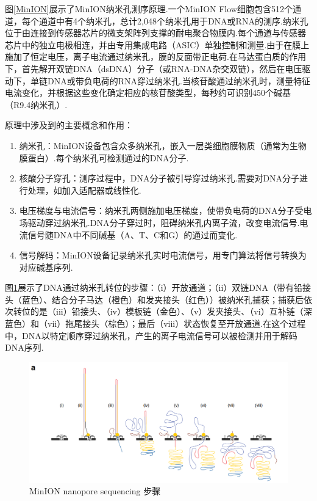 图\ref{MinION}展示了MinION纳米孔测序原理.一个MinION Flow细胞包含512个通道，每个通道中有4个纳米孔，总计2,048个纳米孔用于DNA或RNA的测序.纳米孔位于由连接到传感器芯片的微支架阵列支撑的耐电聚合物膜内.每个通道与传感器芯片中的独立电极相连，并由专用集成电路（ASIC）单独控制和测量.由于在膜上施加了恒定电压，离子电流通过纳米孔，膜的反面带正电荷.在马达蛋白质的作用下，首先解开双链DNA（dsDNA）分子（或RNA-DNA杂交双链），然后在电压驱动下，单链DNA或带负电荷的RNA穿过纳米孔.当核苷酸通过纳米孔时，测量特征电流变化，并根据这些变化确定相应的核苷酸类型，每秒约可识别450个碱基（R9.4纳米孔）.

原理中涉及到的主要概念和作用：
\begin{enumerate}
	\item 纳米孔：MinION设备包含众多纳米孔，嵌入一层类细胞膜物质（通常为生物膜蛋白）.每个纳米孔可检测通过的DNA分子.
	\item 核酸分子穿孔：测序过程中，DNA分子被引导穿过纳米孔.需要对DNA分子进行处理，如加入适配器或线性化.
	\item 电压梯度与电流信号：纳米孔两侧施加电压梯度，使带负电荷的DNA分子受电场驱动穿过纳米孔.DNA分子穿过时，阻碍纳米孔内离子流，改变电流信号.电流信号随DNA中不同碱基（A、T、C和G）的通过而变化.
	\item 信号解码：MinION设备记录纳米孔实时电流信号，用专门算法将信号转换为对应碱基序列.
\end{enumerate}

图\ref{step}展示了DNA通过纳米孔转位的步骤：（i）开放通道；（ii）双链DNA（带有铅接头（蓝色）、结合分子马达（橙色）和发夹接头（红色））被纳米孔捕获；捕获后依次转位的是（iii）铅接头、（iv）模板链（金色）、（v）发夹接头、（vi）互补链（深蓝色）和（vii）拖尾接头（棕色）；最后（viii）状态恢复至开放通道.在这个过程中，DNA以特定顺序穿过纳米孔，产生的离子电流信号可以被检测并用于解码DNA序列.

\begin{figure}[htp!]
	\centering
	\includegraphics[width=0.8\linewidth]{figure/步骤}
	\caption{MinION nanopore sequencing 步骤 \cite{2jain2016oxford}} \label{step}
\end{figure}

